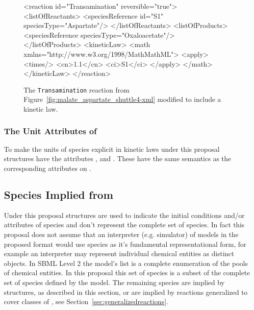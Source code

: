 \documentclass{cekarticle}
\begin{document}
\begin{figure}[h]
\begin{example}
<reaction id="Transamination" reversible="true">
    <listOfReactants>
        <speciesReference id="S1" speciesType="Aspartate"/>
    </listOfReactants>
    <listOfProducts>
        <speciesReference speciesType="Oxaloacetate"/>
    </listOfProducts>
    <kineticLaw>
        <math xmlns="http://www.w3.org/1998/MathMathML">
            <apply>
                <times/>
                <cn>1.1</cn>
                <ci>S1</ci>
            </apply>
        </math>
    </kineticLaw>
</reaction>
\end{example}
\caption{The \texttt{Transamination} reaction from
Figure~\ref{fig:malate_aspartate_shuttle4-xml} modified to include a kinetic law.}
\label{fig:Transamination-xml}
\end{figure}

\subsubsection{The Unit Attributes of }

To make the units of species explicit in kinetic laws under this
proposal  structures have the
attributes ,  and
.  These have the same semantics as
the corresponding attributes on .

\subsection{Species Implied from }

Under this proposal  structures are used to
indicate the initial conditions and/or attributes of species and
don't represent the complete set of species.  In fact this
proposal does not assume that an interpreter (e.g. simulator) of
models in the proposed format would use species as it's
fundamental representational form, for example an interpreter may
represent individual chemical entities as distinct objects. In
SBML Level 2 the model's  list is a complete
enumeration of the pools of chemical entities.  In this proposal
this set of species is a subset of the complete set of species
defined by the model. The remaining species are implied by
 structures, as described in this section, or
are implied by reactions generalized to cover classes of
, see Section~\ref{sec:generalizedreactions}.
\end{document}
